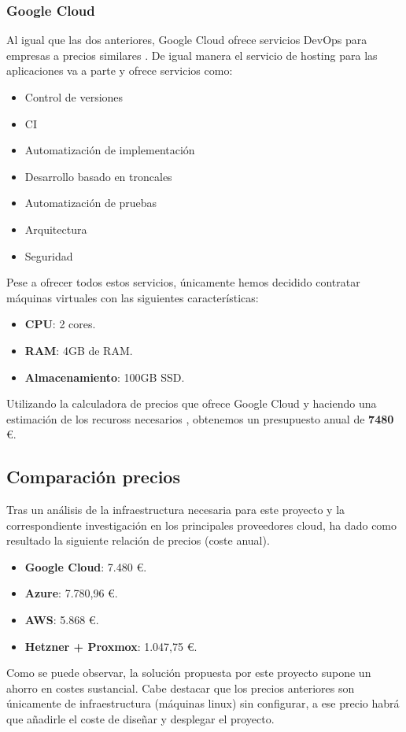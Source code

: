 		\subsubsection{Google Cloud}
			\begin{text}
				Al igual que las dos anteriores, Google Cloud ofrece servicios DevOps para empresas a precios similares \cite{GoogleCloud:online}. De igual manera el servicio de hosting para las aplicaciones va a parte y ofrece servicios como:
				\begin{itemize}
					\item Control de versiones
					\item CI
					\item Automatización de implementación
					\item Desarrollo basado en troncales
					\item Automatización de pruebas
					\item Arquitectura
					\item Seguridad
				\end{itemize}
			
			Pese a ofrecer todos estos servicios, únicamente hemos decidido contratar máquinas virtuales con las siguientes características:
			
			\begin{itemize}
				\item \textbf{CPU}: 2 cores.
				\item \textbf{RAM}: 4GB de RAM.
				\item \textbf{Almacenamiento}: 100GB SSD.
			\end{itemize}
			
			Utilizando la calculadora de precios que ofrece Google Cloud \cite{googlecloudcalculadora:online} y haciendo una estimación de los recuross necesarios , obtenemos un presupuesto anual de \textbf{7480} \euro.
			\end{text}
		
		\subsection{Comparación precios}
		\label{comparacion_precios}
			\begin{text}
				Tras un análisis de la infraestructura necesaria para este proyecto y la correspondiente investigación en los principales proveedores cloud, ha dado como resultado la siguiente relación de precios (coste anual).
				\begin{itemize}
					\item \textbf{Google Cloud}: 7.480 \euro.
					\item \textbf{Azure}: 7.780,96 \euro.
					\item \textbf{AWS}: 5.868 \euro.
					\item \textbf{Hetzner + Proxmox}: 1.047,75 \euro.
				\end{itemize}	
			Como se puede observar, la solución propuesta por este proyecto supone un ahorro en costes sustancial. Cabe destacar que los precios anteriores son únicamente de infraestructura (máquinas linux) sin configurar, a ese precio habrá que añadirle el coste de diseñar y desplegar el proyecto.
			\end{text}
		
